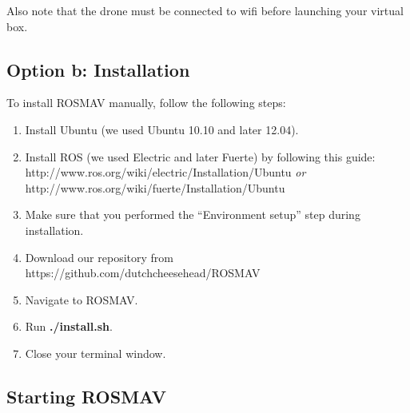 \documentclass[a4paper,10pt]{article}
\begin{document}
Also note that the drone must be connected to wifi before launching your virtual box. 

\subsection{Option b: Installation}
\label{sec:tutb}
To install ROSMAV manually, follow the following steps:
\begin{enumerate}
\item Install Ubuntu (we used Ubuntu 10.10 and later 12.04).

\item Install ROS (we used Electric and later Fuerte) by following this guide: \\
	  http://www.ros.org/wiki/electric/Installation/Ubuntu \textit{or}\\
	  http://www.ros.org/wiki/fuerte/Installation/Ubuntu

\item Make sure that you performed the ``Environment setup'' step during installation.

\item Download our repository from
      https://github.com/dutchcheesehead/ROSMAV

\item Navigate to ROSMAV.

\item Run \textbf{./install.sh}.
\item Close your terminal window.
\end{enumerate}

\subsection{Starting ROSMAV}
\end{document}
